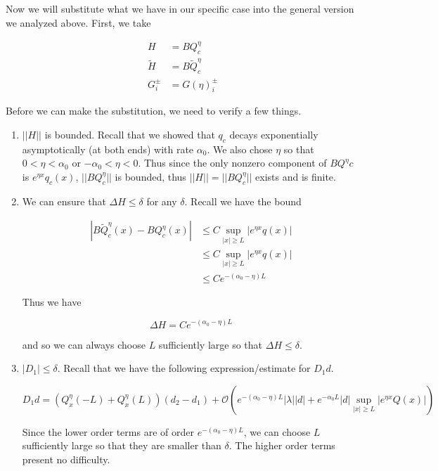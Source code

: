 \documentclass[12pt]{article}
\begin{document}
Now we will substitute what we have in our specific case into the general version we analyzed above. First, we take

\begin{align*}
H &= B Q^\eta_c \\
\tilde{H} &= B \tilde{Q}^\eta_c \\
G_i^\pm &= G(\eta)_i^\pm
\end{align*}

Before we can make the substitution, we need to verify a few things.

\begin{enumerate}

\item $||H||$ is bounded. Recall that we showed that $q_c$ decays exponentially asymptotically (at both ends) with rate $\alpha_0$. We also chose $\eta$ so that $0 < \eta < \alpha_0$ or $-\alpha_0 < \eta < 0$. Thus since the only nonzero component of $B Q^\eta c$ is $e^{\eta x} q_c(x)$, $||B Q^\eta_c||$ is bounded, thus $||H|| = ||B Q^\eta_c||$ exists and is finite.\\

\item We can ensure that $\Delta H \leq \delta$ for any $\delta$. Recall we have the bound

\begin{align*}
| B \tilde{Q}^\eta_c(x) - B Q^\eta_c(x) | &\leq C \sup_{|x| \geq L} |e^{\eta x} q(x)| \\
&\leq C \sup_{|x| \geq L} |e^{\eta x} q(x)| \\
&\leq C e^{-(\alpha_0 - \eta)L}
\end{align*}

Thus we have

\[
\Delta H = C e^{-(\alpha_0 - \eta)L}
\]

and so we can always choose $L$ sufficiently large so that $\Delta H \leq \delta$.

\item $|D_1| \leq \delta$. Recall that we have the following expression/estimate for $D_1 d$. 

\[
D_1 d = (Q^\eta_x(-L) + Q^\eta_x(L))(d_2 - d_1) + \mathcal{O}\left(e^{-(\alpha_0 - \eta) L}|\lambda||d| + e^{-\alpha_0 L} |d| \sup_{|x| \geq L} |e^{\eta x} Q(x)| \right) 
\]

Since the lower order terms are of order $e^{-(\alpha_0 - \eta)L}$, we can choose $L$ sufficiently large so that they are smaller than $\delta$. The higher order terms present no difficulty.

\end{enumerate}
\end{document}
